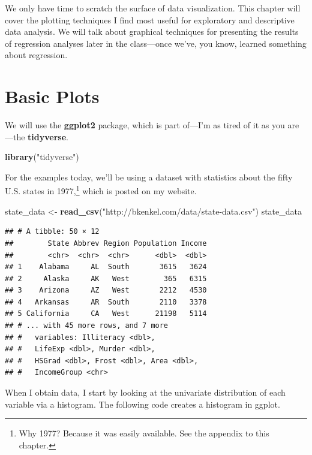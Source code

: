 \documentclass[12pt,oneside,openany]{tufte-book}
\newenvironment{Shaded}{}{}
\newcommand{\KeywordTok}[1]{\textcolor[rgb]{0.00,0.44,0.13}{\textbf{{#1}}}}
\newcommand{\StringTok}[1]{\textcolor[rgb]{0.25,0.44,0.63}{{#1}}}
\newcommand{\NormalTok}[1]{{#1}}
\begin{document}
We only have time to scratch the surface of data visualization. This
chapter will cover the plotting techniques I find most useful for
exploratory and descriptive data analysis. We will talk about graphical
techniques for presenting the results of regression analyses later in
the class---once we've, you know, learned something about regression.

\section{Basic Plots}\label{basic-plots}

We will use the \textbf{ggplot2} package, which is part of---I'm as
tired of it as you are---the \textbf{tidyverse}.

\begin{Shaded}
\begin{Highlighting}[]
\KeywordTok{library}\NormalTok{(}\StringTok{"tidyverse"}\NormalTok{)}
\end{Highlighting}
\end{Shaded}

For the examples today, we'll be using a dataset with statistics about
the fifty U.S. states in 1977,\footnote{Why 1977? Because it was easily
  available. See the appendix to this chapter.} which is posted on my
website.

\begin{Shaded}
\begin{Highlighting}[]
\NormalTok{state_data <-}\StringTok{ }\KeywordTok{read_csv}\NormalTok{(}\StringTok{"http://bkenkel.com/data/state-data.csv"}\NormalTok{)}
\NormalTok{state_data}
\end{Highlighting}
\end{Shaded}

\begin{verbatim}
## # A tibble: 50 × 12
##        State Abbrev Region Population Income
##        <chr>  <chr>  <chr>      <dbl>  <dbl>
## 1    Alabama     AL  South       3615   3624
## 2     Alaska     AK   West        365   6315
## 3    Arizona     AZ   West       2212   4530
## 4   Arkansas     AR  South       2110   3378
## 5 California     CA   West      21198   5114
## # ... with 45 more rows, and 7 more
## #   variables: Illiteracy <dbl>,
## #   LifeExp <dbl>, Murder <dbl>,
## #   HSGrad <dbl>, Frost <dbl>, Area <dbl>,
## #   IncomeGroup <chr>
\end{verbatim}

When I obtain data, I start by looking at the univariate distribution of
each variable via a histogram. The following code creates a histogram in
ggplot.
\end{document}
